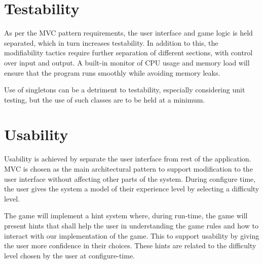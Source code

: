    \section{Testability}
    \label{test}
    As per the MVC pattern requirements, the user interface and game logic is held separated, which in turn increases testability. In addition to this, the modifiability tactics require further separation of different sections, with control over input and output. A built-in monitor of CPU usage and memory load will ensure that the program runs smoothly while avoiding memory leaks.
    
    Use of singletons can be a detriment to testability, especially considering unit testing\cite{online:msdn_singleton}, but the use of such classes are to be held at a minimum.

    \section{Usability}
    Usability is achieved by separate the user interface from rest of the application. MVC is chosen as the main architectural pattern to support modification to the user interface without affecting other parts of the system. During configure time, the user gives the system a model of their experience level by selecting a difficulty level.
    
    The game will implement a hint system where, during run-time, the game will present hints that shall help the user in understanding the game rules and how to interact with our implementation of the game. This to support usability by giving the user more confidence in their choices.  These hints are related to the difficulty level chosen by the user at configure-time.
    
